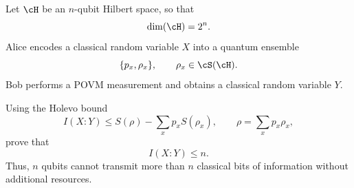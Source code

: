 Let $\cH$ be an $n$-qubit Hilbert space, so that
$$
\dim(\cH)=2^n.
$$
Alice encodes a classical random variable $X$ into a quantum ensemble
$$
\{p_x,\rho_x\},
\qquad
\rho_x\in \cS(\cH).
$$
Bob performs a POVM measurement and obtains a classical random variable $Y$.

Using the Holevo bound
$$
I(X:Y)
\leq
S(\rho)-\sum_x p_x S(\rho_x),
\qquad
\rho=\sum_x p_x\rho_x,
$$
prove that
$$
I(X:Y)\leq n.
$$
Thus, $n$ qubits cannot transmit more than $n$ classical bits of information without additional resources.
